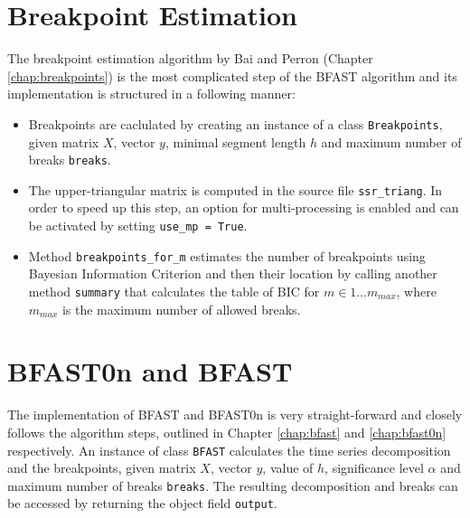 \documentclass[main.tex]{subfiles}
\begin{document}
\section{Breakpoint Estimation}
\label{sec:impl_breakpoints}
The breakpoint estimation algorithm by Bai and Perron (Chapter
\ref{chap:breakpoints}) is the most complicated step of the BFAST
algorithm and its implementation is structured in a following manner:
\begin{itemize}
\item Breakpoints are caclulated by creating an instance of a class
  \texttt{Breakpoints}, given matrix $X$, vector $y$, minimal segment length $h$
  and maximum number of breaks \texttt{breaks}.
\item The upper-triangular matrix is computed in the source file
  \texttt{ssr\_triang}. In order to speed up this step, an option for
  multi-processing is enabled and can be activated by setting \texttt{use\_mp = True}.
\item Method \texttt{breakpoints\_for\_m} estimates the number of
  breakpoints using Bayesian Information Criterion and then their location by
  calling another method \texttt{summary} that calculates the table of BIC for
  $m \in 1 \hdots m_{max}$, where $m_{max}$ is the maximum number of allowed breaks.
\end{itemize}


\section{BFAST0n and BFAST}
\label{sec:impl_bfast}
The implementation of BFAST and BFAST0n is very straight-forward and closely follows the
algorithm steps, outlined in Chapter \ref{chap:bfast} and  \ref{chap:bfast0n}
respectively. An instance of class \texttt{BFAST} calculates the time series
decomposition and the breakpoints, given matrix $X$, vector $y$, value of $h$,
significance level $\alpha$ and maximum number of breaks \texttt{breaks}.
The resulting decomposition and breaks can be accessed by returning the
object field \texttt{output}.

\biblio
\end{document}
